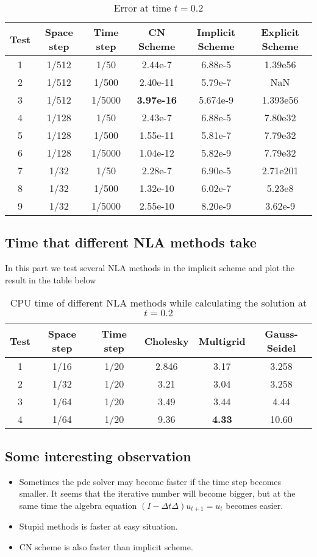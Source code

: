 \documentclass[12pt]{amsart}
\begin{document}
\begin{table}[!hbp]
\begin{tabular}{|c|c|c|c|c|c|}
\hline
\hline
Test & Space step & Time step & CN Scheme & Implicit Scheme&Explicit Scheme \\
\hline
1 & 1/512 & 1/50 & 2.44e-7&6.88e-5 &1.39e56\\
\hline
2& 1/512 & 1/500  & 2.40e-11 & 5.79e-7& NaN \\
\hline
3&1/512 & 1/5000 & \textbf{3.97e-16} & 5.674e-9 &1.393e56\\
\hline
\hline
4&1/128&1/50&2.43e-7&6.88e-5&7.80e32 \\
\hline
5&1/128&1/500&1.55e-11&5.81e-7&7.79e32\\
\hline
6&1/128&1/5000&1.04e-12&5.82e-9&7.79e32\\
\hline
\hline
7& 1/32 &  1/50   & 2.28e-7&6.90e-5 &2.71e201\\
\hline
8& 1/32 &1/500   & 1.32e-10 &6.02e-7 &5.23e8\\
\hline
9& 1/32 & 1/5000   & 2.55e-10 &8.20e-9 &3.62e-9\\
\hline
\end{tabular}
\caption{Error at time $t=0.2$}
\end{table} 

\subsection{Time that different NLA methods take} In this part we test several NLA methods in the implicit scheme and plot the result in the table below


\begin{table}[!hbp]
\begin{tabular}{|c|c|c|c|c|c|}
\hline
\hline
Test & Space step & Time step & Cholesky & Multigrid &Gauss-Seidel \\
\hline
1 & 1/16 & 1/20 & 2.846&3.17&3.258\\
\hline
2 & 1/32 & 1/20 & 3.21&3.04&3.258\\
\hline
3 & 1/64 & 1/20 & 3.49&3.44&4.44\\
\hline
4 & 1/64 & 1/20 & 9.36&\textbf{4.33}&10.60\\
\hline
\end{tabular}
\caption{CPU time of different NLA methods while calculating the solution at $t=0.2$}
\end{table} 

\subsection{Some interesting observation}
\begin{itemize}
\item Sometimes the pde solver may become faster if the time step becomes smaller. It seems that the iterative number will become bigger, but at the same time the algebra equation $(I-\Delta t\Delta)u_{t+1}=u_{t}$ becomes easier. 
\item Stupid methods is faster at easy situation.
\item CN scheme is also faster than implicit scheme.
\end{itemize}
\end{document}
